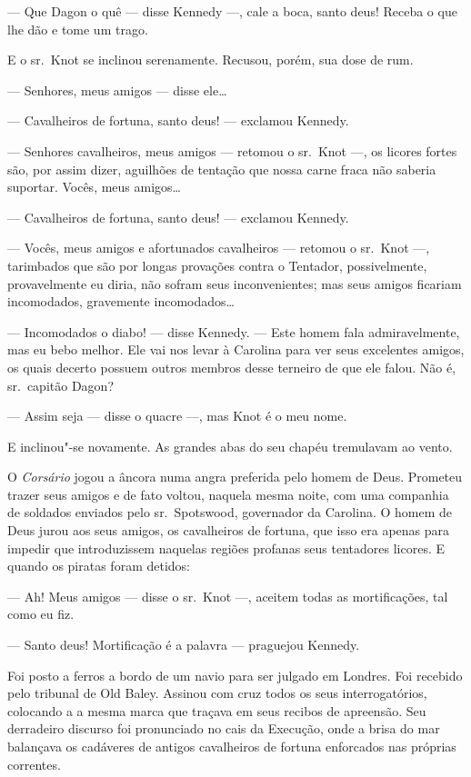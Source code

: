--- Que Dagon o quê --- disse Kennedy ---, cale a boca, santo deus! Receba o que
lhe dão e tome um trago.

E o sr.~Knot se inclinou serenamente. Recusou, porém, sua dose de rum.

--- Senhores, meus amigos --- disse ele\ldots{}

--- Cavalheiros de fortuna, santo deus! --- exclamou Kennedy.

--- Senhores cavalheiros, meus amigos --- retomou o sr.~Knot ---, os licores fortes
são, por assim dizer, aguilhões de tentação que nossa carne fraca não
saberia suportar. Vocês, meus amigos\ldots{}

--- Cavalheiros de fortuna, santo deus! --- exclamou Kennedy.

--- Vocês, meus amigos e afortunados cavalheiros --- retomou o sr.~Knot ---,
tarimbados que são por longas provações contra o Tentador, possivelmente,
provavelmente eu diria, não sofram seus inconvenientes; mas seus amigos
ficariam incomodados, gravemente incomodados\ldots{}

--- Incomodados o diabo! --- disse Kennedy. --- Este homem fala admiravelmente, mas
eu bebo melhor. Ele vai nos levar à Carolina para ver seus excelentes
amigos, os quais decerto possuem outros membros desse terneiro de que ele
falou. Não é, sr.~capitão Dagon?

--- Assim seja --- disse o quacre ---, mas Knot é o meu nome.

E inclinou"-se novamente. As grandes abas do seu chapéu tremulavam ao vento.

O \textit{Corsário} jogou a âncora numa angra preferida pelo homem de Deus.
Prometeu trazer seus amigos e de fato voltou, naquela mesma noite, com uma
companhia de soldados enviados pelo sr.~Spotswood, governador da Carolina.
O homem de Deus jurou aos seus amigos, os cavalheiros de fortuna, que isso
era apenas para impedir que introduzissem naquelas regiões profanas seus
tentadores licores. E quando os piratas foram detidos:

--- Ah! Meus amigos --- disse o sr.~Knot ---, aceitem todas as mortificações, tal
como eu fiz.

--- Santo deus! Mortificação é a palavra --- praguejou Kennedy.

Foi posto a ferros a bordo de um navio para ser julgado em Londres. Foi
recebido pelo tribunal de Old Baley. Assinou com cruz todos os seus
interrogatórios, colocando a a mesma marca que traçava em seus recibos de
apreensão. Seu derradeiro discurso foi pronunciado no cais da Execução,
onde a brisa do mar balançava os cadáveres de antigos cavalheiros de
fortuna enforcados nas próprias correntes.

